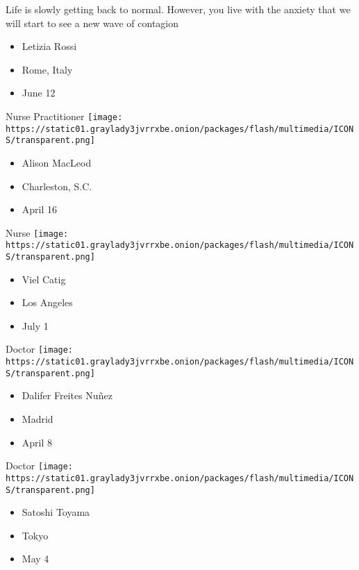 Life is slowly getting back to normal. However, you live with the
anxiety that we will start to see a new wave of contagion

\begin{itemize}
\tightlist
\item
   Letizia Rossi
\item
  Rome, Italy
\item
  June 12
\end{itemize}

\protect\hyperlink{item-alison-macleod}{}

Nurse Practitioner
\texttt{[image: https://static01.graylady3jvrrxbe.onion/packages/flash/multimedia/ICONS/transparent.png]}

\begin{itemize}
\tightlist
\item
  Alison MacLeod
\item
  Charleston, S.C.
\item
  April 16
\end{itemize}

\protect\hyperlink{item-viel-catig}{}

Nurse
\texttt{[image: https://static01.graylady3jvrrxbe.onion/packages/flash/multimedia/ICONS/transparent.png]}

\begin{itemize}
\tightlist
\item
  Viel Catig
\item
  Los Angeles
\item
  July 1
\end{itemize}

\protect\hyperlink{item-dalifer-freites-nunez}{}

Doctor
\texttt{[image: https://static01.graylady3jvrrxbe.onion/packages/flash/multimedia/ICONS/transparent.png]}

\begin{itemize}
\tightlist
\item
  Dalifer Freites Nuñez
\item
  Madrid
\item
  April 8
\end{itemize}

\protect\hyperlink{item-satoshi-toyama}{}

Doctor
\texttt{[image: https://static01.graylady3jvrrxbe.onion/packages/flash/multimedia/ICONS/transparent.png]}

\begin{itemize}
\tightlist
\item
  Satoshi Toyama
\item
  Tokyo
\item
  May 4
\end{itemize}

